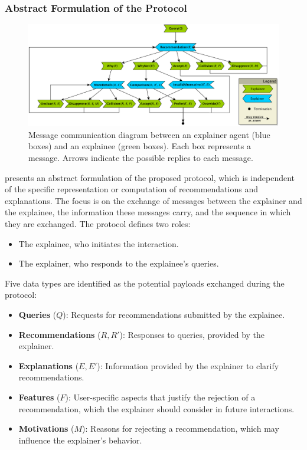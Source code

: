 \subsubsection{Abstract Formulation of the Protocol}
%
\begin{figure}
    \centering
    \includegraphics[width=\linewidth]{figures/user-agent-protocol}
    \caption{
      Message communication diagram between an explainer agent (blue boxes) and an explainee (green boxes).
      Each box represents a message.
      Arrows indicate the possible replies to each message.
    }
    \label{fig:protocol-messages}
\end{figure}
%
 presents an abstract formulation of the proposed protocol, which is independent of the specific representation or computation of recommendations and explanations.
%
The focus is on the exchange of messages between the explainer and the explainee, the information these messages carry, and the sequence in which they are exchanged.
%
The protocol defines two roles:
%
\begin{itemize}
    \item The explainee, who initiates the interaction.
    \item The explainer, who responds to the explainee's queries.
\end{itemize}
%
Five data types are identified as the potential payloads exchanged during the protocol:
%
\begin{itemize}
    \item \textbf{Queries} (\(Q\)): Requests for recommendations submitted by the explainee.
    \item \textbf{Recommendations} (\(R, R'\)): Responses to queries, provided by the explainer.
    \item \textbf{Explanations} (\(E, E'\)): Information provided by the explainer to clarify recommendations.
    \item \textbf{Features} (\(F\)): User-specific aspects that justify the rejection of a recommendation, which the explainer should consider in future interactions.
    \item \textbf{Motivations} (\(M\)): Reasons for rejecting a recommendation, which may influence the explainer's behavior.
\end{itemize}
